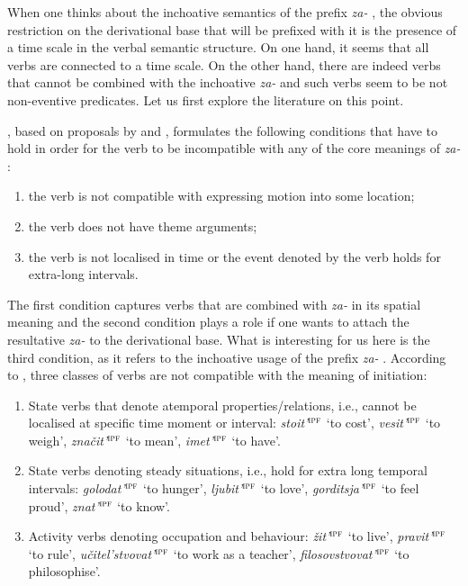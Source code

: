 When one thinks about the inchoative  semantics of the prefix \textit{za-}  , the obvious restriction on the derivational base that will be prefixed with it is the presence of a time scale in the verbal semantic structure. On one hand, it seems that all verbs are connected to a time scale. On the other hand, there are indeed verbs that cannot be combined with the inchoative  \textit{za-}   and such verbs seem to be not non-eventive predicates. Let us first explore the literature on this point.

\citet[275]{Braginsky:08}, based on proposals by \citet{Sheljakin:69} and \citet{Paducheva:96}, formulates the following conditions that have to hold in order for the verb to be incompatible with any of the core meanings of \textit{za-}  :
\begin{enumerate}
\item the verb is not compatible with expressing motion into some location;
\item the verb does not have theme arguments;
\item the verb is not localised in time or the event denoted by the verb holds for extra-long intervals.
\end{enumerate}

The first condition captures verbs that are combined with \textit{za-}   in its spatial  meaning and the second condition plays a role if one wants to attach the resultative  \textit{za-}   to the derivational base. What is interesting for us here is the third condition, as it refers to the inchoative  usage of the prefix \textit{za-}  . According to \citet{Paducheva:96}, three classes of verbs are not compatible with the meaning of initiation:

\begin{enumerate}
\item State verbs that denote atemporal properties/relations, i.e., cannot be localised at specific time moment or interval: \textit{stoit'}$^{\textsc{ipf}}$ `to cost', \textit{vesit'}$^{\textsc{ipf}}$ `to weigh', \textit{zna\v{c}it'}$^{\textsc{ipf}}$ `to mean', \textit{imet'}$^{\textsc{ipf}}$ `to have'.
\item State verbs denoting steady situations,  i.e., hold for extra long temporal intervals: \textit{golodat'}$^{\textsc{ipf}}$ `to hunger', \textit{ljubit'}$^{\textsc{ipf}}$ `to love', \textit{gorditsja'}$^{\textsc{ipf}}$ `to feel proud', \textit{znat'}$^{\textsc{ipf}}$ `to know'.
\item Activity verbs denoting occupation and behaviour: \textit{\v{z}it'}$^{\textsc{ipf}}$ `to live', \textit{pravit'}$^{\textsc{ipf}}$ `to rule', \textit{u\v{c}itel'stvovat'}$^{\textsc{ipf}}$ `to work as a teacher', \textit{filosovstvovat'}$^{\textsc{ipf}}$ `to philosophise'.
\end{enumerate}

